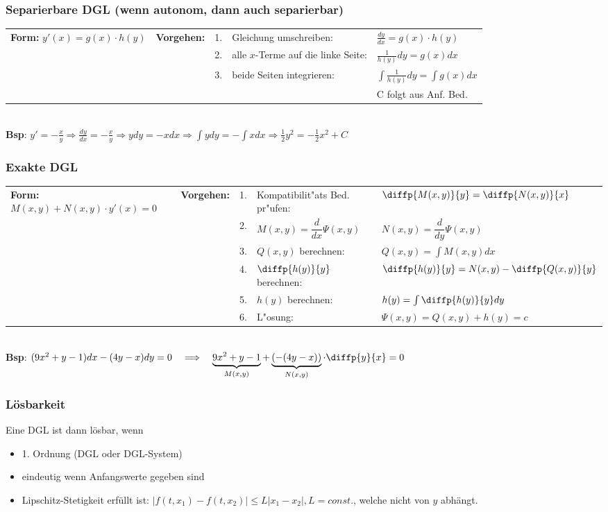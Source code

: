 \subsubsection{Separierbare DGL (wenn autonom, dann auch separierbar)}
\begin{tabular}{p{6cm}p{2cm}p{0.2cm}p{6cm}p{6.5cm}}
\textbf{Form:} \quad $y'(x) = g(x) \cdot h(y)$ &
\textbf{Vorgehen:} &
1.& Gleichung umschreiben: & $\frac{dy}{dx} = g(x) \cdot h(y)$\\ &&
2.& alle $x$-Terme auf die linke Seite: & $\frac{1}{h(y)}dy = g(x) dx$ \\ &&
3.& beide Seiten integrieren: & $\int \frac{1}{h(y)}dy = \int g(x)dx$ \\ & & & & C folgt aus Anf. Bed.\\
\end{tabular} \\
\textbf{Bsp}: $y' = -\frac{x}{y} \Rightarrow \frac{dy}{dx} = -\frac{x}{y} \Rightarrow ydy = -xdx \Rightarrow \int ydy = - \int xdx \Rightarrow \frac{1}{2}y^2 = -\frac{1}{2} x^2 + C$

\subsubsection{Exakte DGL}
\begin{tabular}{p{6.5cm}p{2cm}p{0.2cm}p{3.8cm}p{6.5cm}}
\textbf{Form:} \quad $M(x,y) + N(x,y)\cdot y'(x) = 0$ &
\textbf{Vorgehen:} &
1. & Kompatibilit"ats Bed. pr"ufen: & $\diffp{M(x,y)}{y} = \diffp{N(x,y)}{x}$ \\ &&
2. & $ M(x,y) = \dfrac{d}{dx}\Psi(x,y)$ & $N(x,y) = \dfrac{d}{dy}\Psi(x,y) $ \\ &&
3. & $Q(x,y)$ berechnen: & $Q(x,y) = \int M(x,y) dx$ \\ &&
4. & $\diffp{h(y)}{y}$ berechnen: & $\diffp{h(y)}{y} = N(x,y) - \diffp{Q(x,y)}{y}$ \\ &&
5. & $h(y)$ berechnen: & $h(y) = \int \diffp{h(y)}{y} dy $ \\ &&
6. & L"osung: & $\Psi(x,y) = Q(x,y) + h(y) = c $ \\
\end{tabular} \\
\textbf{Bsp}: $(9x^2 + y -1)dx - (4y -x)dy = 0 \quad \Longrightarrow \quad  \underbrace{9x^2 +y -1}_{M(x,y)} + \underbrace{(-(4y -x))}_{N(x,y)} \cdot \diffp{y}{x} = 0$

\subsubsection{Lösbarkeit}
Eine DGL ist dann lösbar, wenn
\begin{itemize}
	\item 1. Ordnung (DGL oder DGL-System)
	\item eindeutig wenn Anfangswerte gegeben sind
	\item Lipschitz-Stetigkeit erfüllt ist: $\lvert f(t,x_1) - f(t,x_2)\rvert \leq L \lvert x_1 - x_2 \rvert, L = const.$, welche nicht von $y$ abhängt.
\end{itemize}

